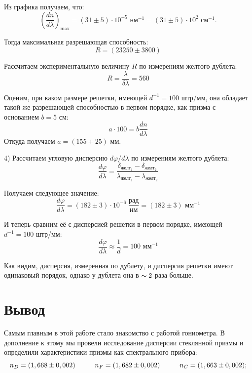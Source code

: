 \documentclass[a4paper,12pt]{article} %
\begin{document}
	Из графика получаем, что:
	\begin{equation*}
		\left(\frac{dn}{d\lambda}\right)_{\text{max}} = (31 \pm 5) \cdot 10^{-5} \text{ нм}^{-1} = (31 \pm 5) \cdot 10^2 \text{ см}^{-1}.
	\end{equation*}

	Тогда максимальная разрешающая способность:
	\begin{equation*}
		\boxed{R = (23250 \pm 3800)}
	\end{equation*}

	Рассчитаем экспериментальную величину $R$ по измерениям желтого дублета:
	\begin{equation*}
		\boxed{R = \frac{\lambda}{\delta \lambda} = 560}
	\end{equation*}

	Оценим, при каком размере решетки, имеющей $d^{-1} = 100$ штр/мм, она обладает такой же разрешающей способностью в первом порядке, как призма с основанием $b = 5$ см:
	\begin{equation*}
		a\cdot 100 = b\frac{dn}{d\lambda}
	\end{equation*}
	Откуда получаем $a = (155 \pm 25)$ мм.
	
	4) Рассчитаем угловую дисперсию $d\varphi/d\lambda$ по измерениям желтого дублета:
	\begin{equation*}
		\frac{d\varphi}{d\lambda} = \frac{\delta_{\text{желт}_1} - \delta_{\text{желт}_2}}{\lambda_{\text{желт}_1} - \lambda_{\text{желт}_2}}
	\end{equation*}

	Получаем следующее значение:
	\begin{equation*}
		\boxed{\frac{d \varphi}{d \lambda} = (182 \pm 3) \cdot 10^{-6} \; \frac{\text{рад}}{\text{нм}} = (182 \pm 3) \text{ мм}^{-1}}
	\end{equation*}

	И теперь сравним её с дисперсией решетки в первом порядке, имеющей $d^{-1} = 100$ штр/мм:
	\begin{equation*}
		\boxed{\frac{d \varphi}{d \lambda} \approx \frac{1}{d} = 100 \text{ мм}^{-1}}
	\end{equation*}
	
	Как видим, дисперсия, измеренная по дублету, и дисперсия решетки имеют одинаковый порядок, однако у дублета она в $\thicksim 2$ раза больше. 
	
	\newpage
	
	\section*{Вывод}
	Самым главным в этой работе стало знакомство с работой гониометра. В дополнение к этому мы провели исследование дисперсии стеклянной призмы и определили характеристики призмы как спектрального прибора:
	\begin{equation*}
		n_D = (1,668 \pm 0,002) \hspace{10mm} n_F = (1,682 \pm 0,002) \hspace{10mm} n_C = (1,663 \pm 0,002);
	\end{equation*}
\end{document}
